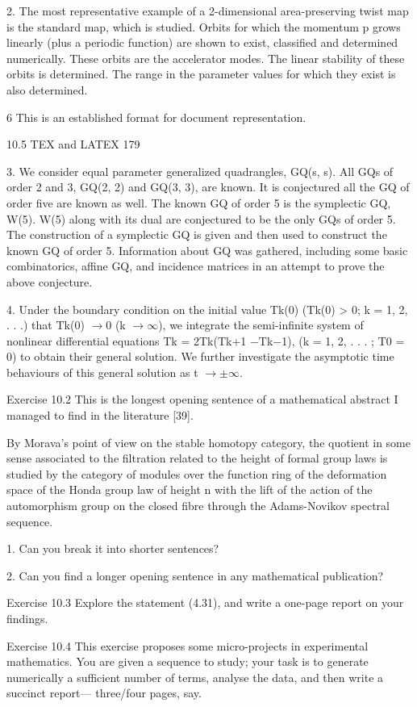 \documentclass[11pt]{article}
\theoremstyle{plain}
\theoremstyle{definition}
\begin{document}
2. The most representative example of a 2-dimensional area-preserving twist map is the standard map, which is studied. Orbits for which the momentum p grows linearly (plus a periodic function) are shown to exist, classified and determined numerically. These orbits are the accelerator modes. The linear stability of these orbits is determined. The range in the parameter values for which they exist is also determined.

6 This is an established format for document representation.

10.5 TEX and LATEX 179

3. We consider equal parameter generalized quadrangles, GQ(s, s). All GQs of order 2 and 3, GQ(2, 2) and GQ(3, 3), are known. It is conjectured all the GQ of order five are known as well. The known GQ of order 5 is the symplectic GQ, W(5). W(5) along with its dual are conjectured to be the only GQs of order 5. The construction of a symplectic GQ is given and then used to construct the known GQ of order 5. Information about GQ was gathered, including some basic combinatorics, affine GQ, and incidence matrices in an attempt to prove the above conjecture.

4. Under the boundary condition on the initial value Tk(0) (Tk(0) > 0; k = 1, 2, . . .) that Tk(0) $\to$0 (k $\to$$\infty$), we integrate the semi-infinite system of nonlinear differential equations  Tk = 2Tk(Tk+1 $-$Tk$-$1), (k = 1, 2, . . . ; T0 = 0) to obtain their general solution. We further investigate the asymptotic time behaviours of this general solution as t $\to$$\pm$$\infty$.

Exercise 10.2 This is the longest opening sentence of a mathematical abstract I managed to find in the literature [39].

By Morava's point of view on the stable homotopy category, the quotient in some sense associated to the filtration related to the height of formal group laws is studied by the category of modules over the function ring of the deformation space of the Honda group law of height n with the lift of the action of the automorphism group on the closed fibre through the Adams-Novikov spectral sequence.

1. Can you break it into shorter sentences?

2. Can you find a longer opening sentence in any mathematical publication?

Exercise 10.3 Explore the statement (4.31), and write a one-page report on your findings.

Exercise 10.4 This exercise proposes some micro-projects in experimental mathematics. You are given a sequence to study; your task is to generate numerically a sufficient number of terms, analyse the data, and then write a succinct report--- three/four pages, say.
\end{document}
